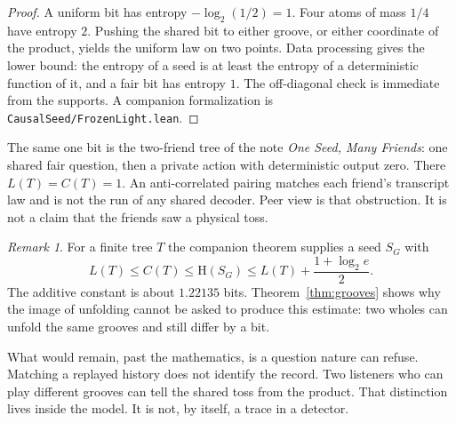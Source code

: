 \documentclass[11pt]{article}
\theoremstyle{remark}\newtheorem{remark}[theorem]{Remark}
\newcommand{\HH}{\mathrm H}
\begin{document}
\begin{proof}
A uniform bit has entropy $-\log_2(1/2)=1$.
Four atoms of mass $1/4$ have entropy $2$.
Pushing the shared bit to either groove, or either coordinate of the product,
yields the uniform law on two points.
Data processing gives the lower bound: the entropy of a seed is at least the
entropy of a deterministic function of it, and a fair bit has entropy $1$.
The off-diagonal check is immediate from the supports.
A companion formalization is \texttt{CausalSeed/FrozenLight.lean}.
\end{proof}

The same one bit is the two-friend tree of the note \emph{One Seed, Many Friends}:
one shared fair question, then a private action with deterministic output zero.
There $L(T)=C(T)=1$. An anti-correlated pairing matches each friend's transcript
law and is not the run of any shared decoder. Peer view is that obstruction.
It is not a claim that the friends saw a physical toss.

\begin{remark}
For a finite tree $T$ the companion theorem supplies a seed $S_G$ with
\[
L(T)\le C(T)\le \HH(S_G)\le L(T)+\frac{1+\log_2 e}{2}.
\]
The additive constant is about $1.22135$ bits. Theorem~\ref{thm:grooves}
shows why the image of unfolding cannot be asked to produce this estimate:
two wholes can unfold the same grooves and still differ by a bit.
\end{remark}

What would remain, past the mathematics, is a question nature can refuse.
Matching a replayed history does not identify the record.
Two listeners who can play different grooves can tell the shared toss from
the product. That distinction lives inside the model.
It is not, by itself, a trace in a detector.
\end{document}
